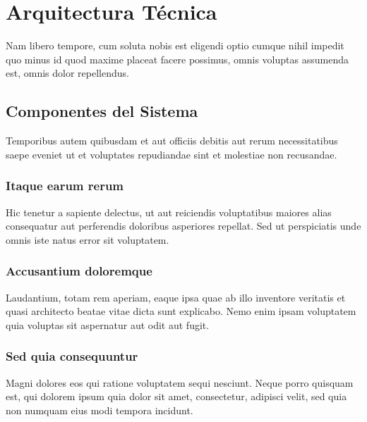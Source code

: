 \chapter{Arquitectura Técnica}

Nam libero tempore, cum soluta nobis est eligendi optio cumque nihil impedit quo minus id quod maxime placeat facere possimus, omnis voluptas assumenda est, omnis dolor repellendus.

\section{Componentes del Sistema}

Temporibus autem quibusdam et aut officiis debitis aut rerum necessitatibus saepe eveniet ut et voluptates repudiandae sint et molestiae non recusandae.

\subsection{Itaque earum rerum}
Hic tenetur a sapiente delectus, ut aut reiciendis voluptatibus maiores alias consequatur aut perferendis doloribus asperiores repellat. Sed ut perspiciatis unde omnis iste natus error sit voluptatem.

\subsection{Accusantium doloremque}
Laudantium, totam rem aperiam, eaque ipsa quae ab illo inventore veritatis et quasi architecto beatae vitae dicta sunt explicabo. Nemo enim ipsam voluptatem quia voluptas sit aspernatur aut odit aut fugit.

\subsection{Sed quia consequuntur}
Magni dolores eos qui ratione voluptatem sequi nesciunt. Neque porro quisquam est, qui dolorem ipsum quia dolor sit amet, consectetur, adipisci velit, sed quia non numquam eius modi tempora incidunt.